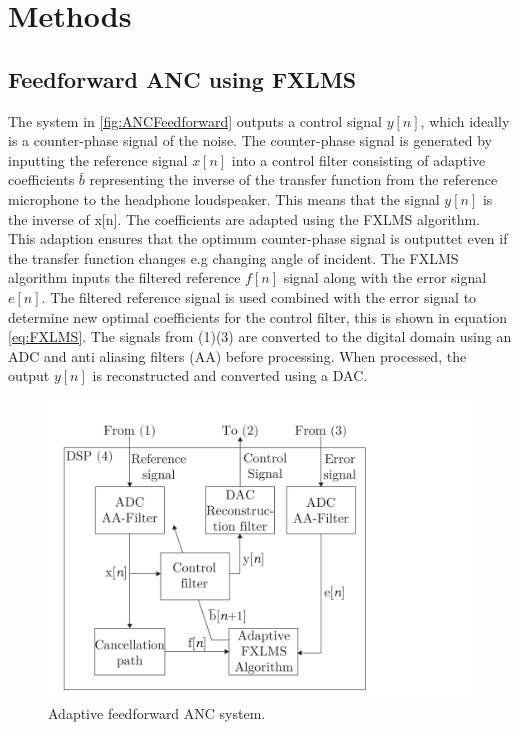 \section{Methods}
\subsection{Feedforward ANC using FXLMS}


The system in \autoref{fig:ANCFeedforward} outputs a control signal $y[n]$, which ideally is a counter-phase signal of the noise. The counter-phase signal is generated by inputting the reference signal $x[n]$ into a control filter consisting of adaptive coefficients $\bar{b}$ representing the inverse of the transfer function from the reference microphone to the headphone loudspeaker. This means that the signal $y[n]$ is the inverse of x[n]. The coefficients are adapted using the FXLMS algorithm. This adaption ensures that the optimum counter-phase signal is outputtet even if the transfer function changes e.g changing angle of incident. The FXLMS algorithm inputs the filtered reference $f[n]$ signal along with the error signal $e[n]$. The filtered reference signal is used combined with the error signal to determine new optimal coefficients for the control filter, this is shown in equation \ref{eq:FXLMS}. The signals from (1)(3) are converted to the digital domain using an ADC and anti aliasing filters (AA) before processing. When processed, the output $y[n]$ is reconstructed and converted using a DAC.


\begin{figure}[H]
	\includegraphics[width=1\columnwidth]{figures/ArticleIllustrations/ANCFeedForward}
	\caption{Adaptive feedforward ANC system.}
	\label{fig:ANCFeedforward}
\end{figure}

